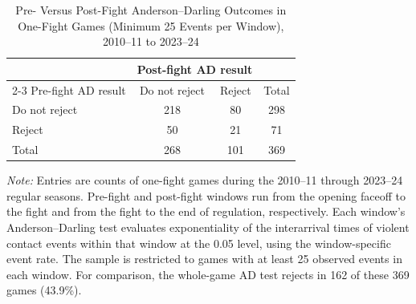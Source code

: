 \begin{table}[htbp]
\centering
\caption{Pre- Versus Post-Fight Anderson--Darling Outcomes in One-Fight Games (Minimum 25 Events per Window), 2010--11 to 2023--24}
\label{tab:one_fight_AD_rejection_min_25_20102011_20232024}
\small
\renewcommand{\arraystretch}{1.15}
\setlength{\tabcolsep}{6pt}

\begin{tabular*}{0.78\textwidth}{@{\extracolsep{\fill}}lccc}
\toprule
 & \multicolumn{2}{c}{Post-fight AD result} & \\
\cmidrule(lr){2-3}
Pre-fight AD result & Do not reject & Reject & Total \\
\midrule
Do not reject & 218 & 80 & 298 \\
Reject & 50 & 21 & 71 \\
\midrule
Total & 268 & 101 & 369 \\
\bottomrule
\end{tabular*}

\vspace{0.4em}
\parbox{0.78\textwidth}{
\footnotesize
\textit{Note:} Entries are counts of one-fight games during the 2010--11 through 2023--24 regular seasons. Pre-fight and post-fight windows run from the opening faceoff to the fight and from the fight to the end of regulation, respectively. Each window's Anderson--Darling test evaluates exponentiality of the interarrival times of violent contact events within that window at the 0.05 level, using the window-specific event rate. The sample is restricted to games with at least 25 observed events in each window. For comparison, the whole-game AD test rejects in 162 of these 369 games (43.9\%).
}
\end{table}
